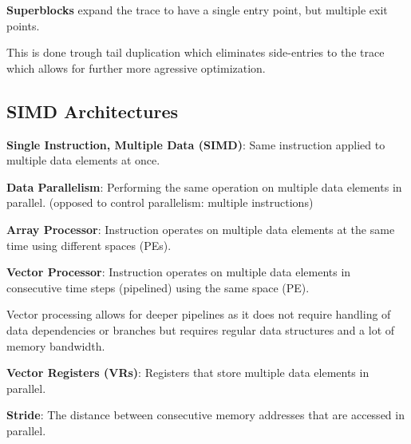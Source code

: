 \begin{definition}
	\textbf{Superblocks} expand the trace to have a single entry point, but multiple exit points.
\end{definition}

\begin{remark}
	This is done trough tail duplication which eliminates side-entries to the trace which allows for further more agressive optimization.
\end{remark}

\subsection{SIMD Architectures}

\begin{definition}
	\textbf{Single Instruction, Multiple Data (SIMD)}: Same instruction applied to multiple data elements at once.
\end{definition}

\begin{definition}
	\textbf{Data Parallelism}: Performing the same operation on multiple data elements in parallel. (opposed to control parallelism: multiple instructions)
\end{definition}

\begin{definition}
	\textbf{Array Processor}: Instruction operates on multiple data elements at the same time using different spaces (PEs).
\end{definition}

\begin{definition}
	\textbf{Vector Processor}: Instruction operates on multiple data elements in consecutive time steps (pipelined) using the same space (PE).
\end{definition}

\begin{remark}
	Vector processing allows for deeper pipelines as it does not require handling of data dependencies or branches but requires regular data structures and a lot of memory bandwidth.
\end{remark}

\begin{definition}
	\textbf{Vector Registers (VRs)}: Registers that store multiple data elements in parallel.
\end{definition}

\begin{definition}
	\textbf{Stride}: The distance between consecutive memory addresses that are accessed in parallel.
\end{definition}

